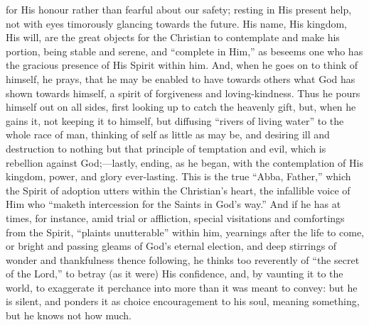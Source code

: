 for His honour rather than fearful about our safety; resting in His
present help, not with eyes timorously glancing towards the future. His
name, His kingdom, His will, are the great objects for the Christian to
contemplate and make his portion, being stable and serene, and
``complete in Him,'' as beseems one who has the gracious
presence of His Spirit within him. And, when he goes on to think of
himself, he prays, that he may be enabled to have towards others what God
has shown towards himself, a spirit of forgiveness and loving-kindness.
Thus he pours himself out on all sides, first looking up to catch the
heavenly gift, but, when he gains it, not keeping it to himself, but
diffusing ``rivers of living water'' to the whole race of man,
thinking of self as little as may be, and desiring ill and destruction
to nothing but that principle of temptation and evil, which is rebellion
against God;—lastly, ending, as he began, with the contemplation of
His kingdom, power, and glory ever-lasting. This is the true ``Abba,
Father,'' which the Spirit of adoption utters within the Christian's
heart, the infallible voice of Him who ``maketh intercession for the
Saints in God's way.'' And if he has at times, for instance, amid
trial or affliction, special visitations and comfortings from the
Spirit, ``plaints unutterable'' within him, yearnings after the
life to come, or bright and passing gleams of God's eternal election,
and deep stirrings of wonder and thankfulness thence following, he
thinks too reverently of ``the secret of the Lord,'' to betray
(as it were) His confidence, and, by vaunting it to the world, to
exaggerate it perchance into more than it was meant to convey: but he is
silent, and ponders it as choice encouragement to his soul, meaning
something, but he knows not how much.

